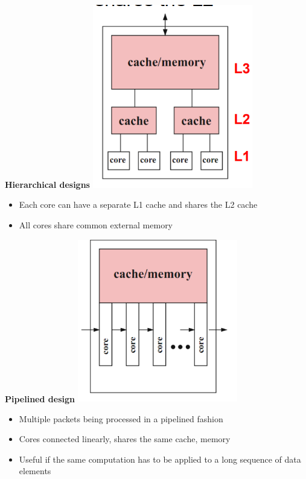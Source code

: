 \documentclass[10pt, landscape]{article}
\begin{document}
\begin{multicols}{4}
\textbf{Hierarchical designs}
\includegraphics*[width=7cm]{hierarchical_design}
\begin{itemize}
    \item Each core can have a separate L1 cache and shares the L2 cache
    \item All cores share common external memory 
\end{itemize}

\textbf{Pipelined design}
\includegraphics*[width=7cm]{pipelined_design}
\begin{itemize}
    \item Multiple packets being processed in a pipelined fashion 
    \item Cores connected linearly, shares the same cache, memory 
    \item Useful if the same computation has to be applied to a long sequence of data elements
\end{itemize}


\end{multicols}
\end{document}
